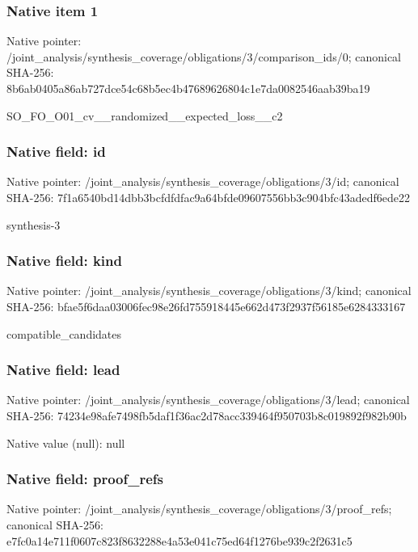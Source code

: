 \documentclass[10pt,a4paper]{article}
\begin{document}
\subsubsection{Native item 1}
Native pointer: /joint\_\allowbreak{}analysis/synthesis\_\allowbreak{}coverage/obligations/3/comparison\_\allowbreak{}ids/0; canonical SHA-256: 8b6ab0405a86ab727dce54c68b5ec4b47689626804c1e7da0082546aab39ba19

\begingroup\raggedright\sloppy SO\_\allowbreak{}FO\_\allowbreak{}O01\_\allowbreak{}cv\_\allowbreak{}\_\allowbreak{}randomized\_\allowbreak{}\_\allowbreak{}expected\_\allowbreak{}loss\_\allowbreak{}\_\allowbreak{}c2\par\endgroup

\subsubsection{Native field: id}
Native pointer: /joint\_\allowbreak{}analysis/synthesis\_\allowbreak{}coverage/obligations/3/id; canonical SHA-256: 7f1a6540bd14dbb3bcfdfdfac9a64bfde09607556bb3c904bfc43adedf6ede22

\begingroup\raggedright\sloppy synthesis-3\par\endgroup

\subsubsection{Native field: kind}
Native pointer: /joint\_\allowbreak{}analysis/synthesis\_\allowbreak{}coverage/obligations/3/kind; canonical SHA-256: bfae5f6daa03006fec98e26fd755918445e662d473f2937f56185e6284333167

\begingroup\raggedright\sloppy compatible\_\allowbreak{}candidates\par\endgroup

\subsubsection{Native field: lead}
Native pointer: /joint\_\allowbreak{}analysis/synthesis\_\allowbreak{}coverage/obligations/3/lead; canonical SHA-256: 74234e98afe7498fb5daf1f36ac2d78acc339464f950703b8c019892f982b90b

Native value (null): null

\subsubsection{Native field: proof\_\allowbreak{}refs}
Native pointer: /joint\_\allowbreak{}analysis/synthesis\_\allowbreak{}coverage/obligations/3/proof\_\allowbreak{}refs; canonical SHA-256: e7fc0a14e711f0607c823f8632288e4a53e041c75ed64f1276be939c2f2631c5
\end{document}
